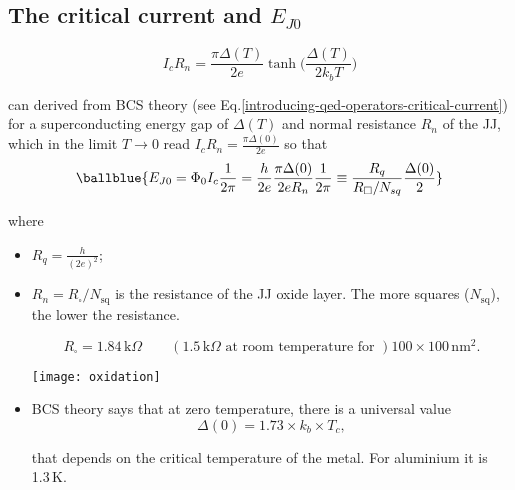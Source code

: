 \begin{framed}
\begin{itemize}
\end{itemize}

\subsection{The critical current and $E_{J0}$}
\label{sec:crit-curr-josephs}

  \begin{equation}
    I_cR_n      =
    \frac{\pi\Delta(T)}{2e}\tanh\big(\frac{\Delta(T)}{2k_bT}\big)
  \end{equation}

  \noindent     can     derived      from     BCS     theory     (see
  Eq.\eqref{introducing-qed-operators-critical-current})     for    a
  superconducting  energy  gap of  $  \Delta(T)  $ and  normal  resistance
  $  R_n   $  of  the   JJ,  which  in  the   limit  $T  \rightarrow   0$  read
  $ I_cR_n = \frac{\pi\Delta(0)}{2e}$ so that
  \begin{equation}
    \ballblue{E_{J0} = \Phi_0I_c\frac{1}{2\pi} = \frac{h}{2e}\frac{\pi\Delta(0)}{2eR_n}\frac{1}{2\pi} \equiv \frac{R_q}{R_{\square}/N_{sq}}\frac{\Delta(0)}{2}}
  \end{equation}

  \noindent where

  \begin{itemize}
  \item $R_{q} = \frac{h}{(2e)^{2}}$;
  \item  $R_n =  R_{\square}/ N_{\text{sq}}$  is the  resistance of  the JJ
    oxide  layer.   The  more    squares
    ($N_{\text{sq}}$), the lower the resistance.

     \begin{equation}
       R_{\square} = 1.84\,\text{k}\Omega \qquad (1.5\,\text{k}\Omega \text{ at room temperature for }) 100 \times 100\,\text{nm}^2.
     \end{equation}


    \begin{center}
      \texttt{[image: oxidation]}
    \end{center}

  \item  BCS  theory  says  that  at zero  temperature,  there  is  a
    universal value
    \begin{equation}
      \Delta(0) = 1.73 \times  k_{b} \times T_{c},
    \end{equation}

    \noindent  that  depends  on  the  critical  temperature  of  the
    metal. For aluminium it is 1.3\,K.
  \end{itemize}
\end{framed}

